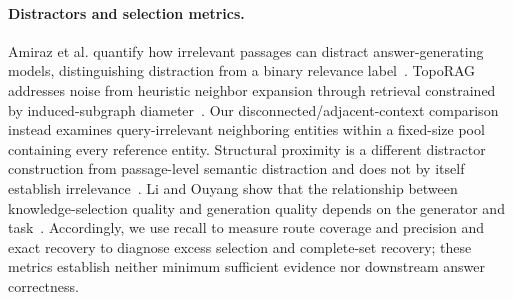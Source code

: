 \paragraph{Distractors and selection metrics.}
Amiraz et al. quantify how irrelevant passages can distract answer-generating models, distinguishing distraction from a binary relevance label~\cite{amiraz2025distracting}. TopoRAG addresses noise from heuristic neighbor expansion through retrieval constrained by induced-subgraph diameter~\cite{wu2026toporag}. Our disconnected/adjacent-context comparison instead examines query-irrelevant neighboring entities within a fixed-size pool containing every reference entity. Structural proximity is a different distractor construction from passage-level semantic distraction and does not by itself establish irrelevance~\cite{amiraz2025distracting}. Li and Ouyang show that the relationship between knowledge-selection quality and generation quality depends on the generator and task~\cite{li2025selection}. Accordingly, we use recall to measure route coverage and precision and exact recovery to diagnose excess selection and complete-set recovery; these metrics establish neither minimum sufficient evidence nor downstream answer correctness.
